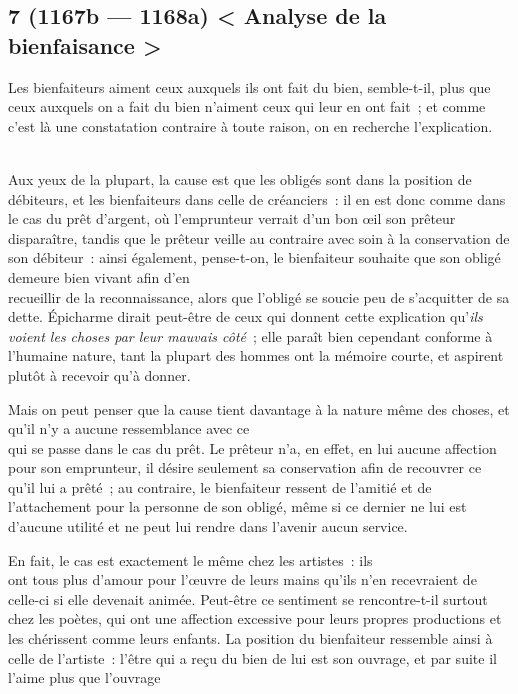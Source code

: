 \documentclass[french,twoside]{book} %
\begin{document}
\subsection[{7 (1167b — 1168a) < Analyse de la bienfaisance >}]{7 (1167b — 1168a) < Analyse de la bienfaisance >}
\noindent Les bienfaiteurs aiment ceux auxquels ils ont fait du bien, semble-t-il, plus que ceux auxquels on a fait du bien n’aiment ceux qui leur en ont fait ; et comme c’est là une constatation contraire à toute raison, on en recherche l’explication.\par
\\
Aux yeux de la plupart, la cause est que les obligés sont dans la position de débiteurs, et les bienfaiteurs dans celle de créanciers : il en est donc comme dans le cas du prêt d’argent, où l’emprunteur verrait d’un bon œil son prêteur disparaître, tandis que le prêteur veille au contraire avec soin à la conservation de son débiteur : ainsi également, pense-t-on, le bienfaiteur souhaite que son obligé demeure bien vivant afin d’en \\
recueillir de la reconnaissance, alors que l’obligé se soucie peu de s’acquitter de sa dette. Épicharme dirait peut-être de ceux qui donnent cette explication qu’{\itshape ils voient les choses par leur mauvais côté} ; elle paraît bien cependant conforme à l’humaine nature, tant la plupart des hommes ont la mémoire courte, et aspirent plutôt à recevoir qu’à donner.\par
Mais on peut penser que la cause tient davantage à la nature même des choses, et qu’il n’y a aucune ressemblance avec ce \\
qui se passe dans le cas du prêt. Le prêteur n’a, en effet, en lui aucune affection pour son emprunteur, il désire seulement sa conservation afin de recouvrer ce qu’il lui a prêté ; au contraire, le bienfaiteur ressent de l’amitié et de l’attachement pour la personne de son obligé, même si ce dernier ne lui est d’aucune utilité et ne peut lui rendre dans l’avenir aucun service.\par
En fait, le cas est exactement le même chez les artistes : ils \\
ont tous plus d’amour pour l’œuvre de leurs mains qu’ils n’en recevraient de celle-ci si elle devenait animée. Peut-être ce  sentiment se rencontre-t-il surtout chez les poètes, qui ont une affection excessive pour leurs propres productions et les chérissent comme leurs enfants. La position du bienfaiteur ressemble ainsi à celle de l’artiste : l’être qui a reçu du bien de lui est son ouvrage, et par suite il l’aime plus que l’ouvrage \\
\end{document}

